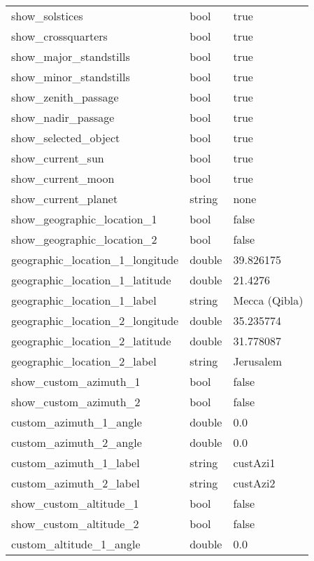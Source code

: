 \begin{longtable}{l|l|l}
show\_solstices                &bool        & true  \\
show\_crossquarters            &bool        & true  \\
show\_major\_standstills       &bool        & true  \\
show\_minor\_standstills       &bool        & true  \\
show\_zenith\_passage          &bool        & true  \\
show\_nadir\_passage           &bool        & true  \\
show\_selected\_object         &bool        & true  \\
show\_current\_sun             &bool        & true  \\
show\_current\_moon            &bool        & true  \\
show\_current\_planet          &string      & none  \\\midrule
show\_geographic\_location\_1  &bool        & false         \\
show\_geographic\_location\_2  &bool        & false         \\
geographic\_location\_1\_longitude &double  & 39.826175     \\
geographic\_location\_1\_latitude  &double  & 21.4276       \\
geographic\_location\_1\_label     &string  & Mecca (Qibla) \\
geographic\_location\_2\_longitude &double  & 35.235774     \\
geographic\_location\_2\_latitude  &double  & 31.778087     \\
geographic\_location\_2\_label     &string  & Jerusalem     \\\midrule
show\_custom\_azimuth\_1       &bool        & false    \\
show\_custom\_azimuth\_2       &bool        & false    \\
custom\_azimuth\_1\_angle      &double      & 0.0      \\
custom\_azimuth\_2\_angle      &double      & 0.0      \\
custom\_azimuth\_1\_label      &string      & custAzi1 \\
custom\_azimuth\_2\_label      &string      & custAzi2 \\
show\_custom\_altitude\_1      &bool        & false    \\
show\_custom\_altitude\_2      &bool        & false    \\
custom\_altitude\_1\_angle     &double      & 0.0      \\

\end{longtable}
